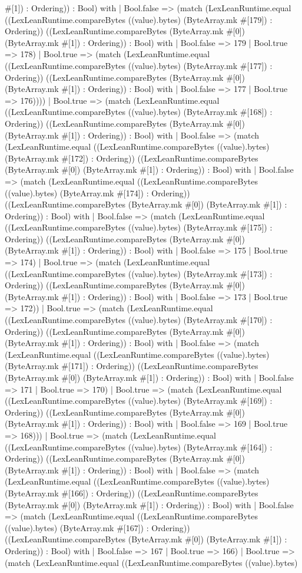 \documentclass[11pt]{article}
\begin{document}
\#[1]) : Ordering)) : Bool) with | Bool.false => (match (LexLeanRuntime.equal ((LexLeanRuntime.compareBytes ((value).bytes) (ByteArray.mk \#[179]) : Ordering)) ((LexLeanRuntime.compareBytes (ByteArray.mk \#[0]) (ByteArray.mk \#[1]) : Ordering)) : Bool) with | Bool.false => 179 | Bool.true => 178) | Bool.true => (match (LexLeanRuntime.equal ((LexLeanRuntime.compareBytes ((value).bytes) (ByteArray.mk \#[177]) : Ordering)) ((LexLeanRuntime.compareBytes (ByteArray.mk \#[0]) (ByteArray.mk \#[1]) : Ordering)) : Bool) with | Bool.false => 177 | Bool.true => 176)))) | Bool.true => (match (LexLeanRuntime.equal ((LexLeanRuntime.compareBytes ((value).bytes) (ByteArray.mk \#[168]) : Ordering)) ((LexLeanRuntime.compareBytes (ByteArray.mk \#[0]) (ByteArray.mk \#[1]) : Ordering)) : Bool) with | Bool.false => (match (LexLeanRuntime.equal ((LexLeanRuntime.compareBytes ((value).bytes) (ByteArray.mk \#[172]) : Ordering)) ((LexLeanRuntime.compareBytes (ByteArray.mk \#[0]) (ByteArray.mk \#[1]) : Ordering)) : Bool) with | Bool.false => (match (LexLeanRuntime.equal ((LexLeanRuntime.compareBytes ((value).bytes) (ByteArray.mk \#[174]) : Ordering)) ((LexLeanRuntime.compareBytes (ByteArray.mk \#[0]) (ByteArray.mk \#[1]) : Ordering)) : Bool) with | Bool.false => (match (LexLeanRuntime.equal ((LexLeanRuntime.compareBytes ((value).bytes) (ByteArray.mk \#[175]) : Ordering)) ((LexLeanRuntime.compareBytes (ByteArray.mk \#[0]) (ByteArray.mk \#[1]) : Ordering)) : Bool) with | Bool.false => 175 | Bool.true => 174) | Bool.true => (match (LexLeanRuntime.equal ((LexLeanRuntime.compareBytes ((value).bytes) (ByteArray.mk \#[173]) : Ordering)) ((LexLeanRuntime.compareBytes (ByteArray.mk \#[0]) (ByteArray.mk \#[1]) : Ordering)) : Bool) with | Bool.false => 173 | Bool.true => 172)) | Bool.true => (match (LexLeanRuntime.equal ((LexLeanRuntime.compareBytes ((value).bytes) (ByteArray.mk \#[170]) : Ordering)) ((LexLeanRuntime.compareBytes (ByteArray.mk \#[0]) (ByteArray.mk \#[1]) : Ordering)) : Bool) with | Bool.false => (match (LexLeanRuntime.equal ((LexLeanRuntime.compareBytes ((value).bytes) (ByteArray.mk \#[171]) : Ordering)) ((LexLeanRuntime.compareBytes (ByteArray.mk \#[0]) (ByteArray.mk \#[1]) : Ordering)) : Bool) with | Bool.false => 171 | Bool.true => 170) | Bool.true => (match (LexLeanRuntime.equal ((LexLeanRuntime.compareBytes ((value).bytes) (ByteArray.mk \#[169]) : Ordering)) ((LexLeanRuntime.compareBytes (ByteArray.mk \#[0]) (ByteArray.mk \#[1]) : Ordering)) : Bool) with | Bool.false => 169 | Bool.true => 168))) | Bool.true => (match (LexLeanRuntime.equal ((LexLeanRuntime.compareBytes ((value).bytes) (ByteArray.mk \#[164]) : Ordering)) ((LexLeanRuntime.compareBytes (ByteArray.mk \#[0]) (ByteArray.mk \#[1]) : Ordering)) : Bool) with | Bool.false => (match (LexLeanRuntime.equal ((LexLeanRuntime.compareBytes ((value).bytes) (ByteArray.mk \#[166]) : Ordering)) ((LexLeanRuntime.compareBytes (ByteArray.mk \#[0]) (ByteArray.mk \#[1]) : Ordering)) : Bool) with | Bool.false => (match (LexLeanRuntime.equal ((LexLeanRuntime.compareBytes ((value).bytes) (ByteArray.mk \#[167]) : Ordering)) ((LexLeanRuntime.compareBytes (ByteArray.mk \#[0]) (ByteArray.mk \#[1]) : Ordering)) : Bool) with | Bool.false => 167 | Bool.true => 166) | Bool.true => (match (LexLeanRuntime.equal ((LexLeanRuntime.compareBytes ((value).bytes) 
\end{document}
